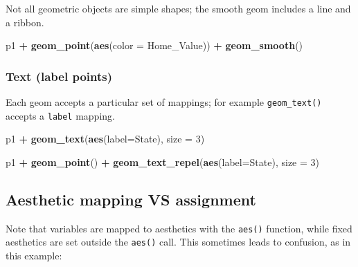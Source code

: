 \documentclass[]{book}
\newenvironment{Shaded}{\begin{snugshade}}{\end{snugshade}}
\newcommand{\KeywordTok}[1]{\textcolor[rgb]{0.13,0.29,0.53}{\textbf{#1}}}
\newcommand{\DataTypeTok}[1]{\textcolor[rgb]{0.13,0.29,0.53}{#1}}
\newcommand{\DecValTok}[1]{\textcolor[rgb]{0.00,0.00,0.81}{#1}}
\newcommand{\StringTok}[1]{\textcolor[rgb]{0.31,0.60,0.02}{#1}}
\newcommand{\OperatorTok}[1]{\textcolor[rgb]{0.81,0.36,0.00}{\textbf{#1}}}
\newcommand{\NormalTok}[1]{#1}
\begin{document}
Not all geometric objects are simple shapes; the smooth geom includes a
line and a ribbon.

\begin{Shaded}
\begin{Highlighting}[]
\NormalTok{p1 }\OperatorTok{+}
\StringTok{  }\KeywordTok{geom_point}\NormalTok{(}\KeywordTok{aes}\NormalTok{(}\DataTypeTok{color =}\NormalTok{ Home_Value)) }\OperatorTok{+}
\StringTok{  }\KeywordTok{geom_smooth}\NormalTok{()}
\end{Highlighting}
\end{Shaded}

\subsubsection{Text (label points)}\label{text-label-points}

Each geom accepts a particular set of mappings; for example
\texttt{geom\_text()} accepts a \texttt{label} mapping.

\begin{Shaded}
\begin{Highlighting}[]
\NormalTok{p1 }\OperatorTok{+}\StringTok{ }
\StringTok{  }\KeywordTok{geom_text}\NormalTok{(}\KeywordTok{aes}\NormalTok{(}\DataTypeTok{label=}\NormalTok{State), }\DataTypeTok{size =} \DecValTok{3}\NormalTok{)}
\end{Highlighting}
\end{Shaded}

\begin{Shaded}
\begin{Highlighting}[]
\NormalTok{p1 }\OperatorTok{+}\StringTok{ }
\StringTok{  }\KeywordTok{geom_point}\NormalTok{() }\OperatorTok{+}\StringTok{ }
\StringTok{  }\KeywordTok{geom_text_repel}\NormalTok{(}\KeywordTok{aes}\NormalTok{(}\DataTypeTok{label=}\NormalTok{State), }\DataTypeTok{size =} \DecValTok{3}\NormalTok{)}
\end{Highlighting}
\end{Shaded}

\subsection{Aesthetic mapping VS
assignment}\label{aesthetic-mapping-vs-assignment}

Note that variables are mapped to aesthetics with the \texttt{aes()}
function, while fixed aesthetics are set outside the \texttt{aes()}
call. This sometimes leads to confusion, as in this example:
\end{document}
